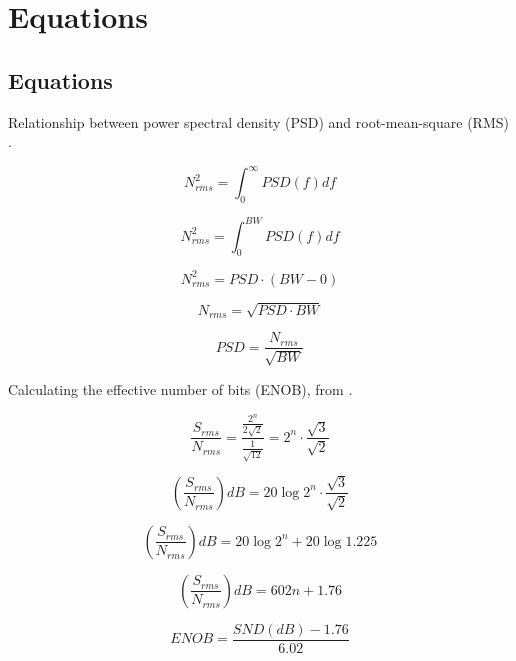 \chapter[Equations]{Equations}

\section{Equations}
Relationship between power spectral density (PSD) and root-mean-square (RMS) \cite{freescale_accel_terminology}.

\begin{equation}
N^{2}_{rms}=\int_0^\infty{PSD(f)df}
\label{eq2}
\end{equation}

\begin{equation}
N^{2}_{rms}=\int_0^{BW}{PSD(f)df}
\label{eq3}
\end{equation}

\begin{equation}
N^{2}_{rms}=PSD \cdot (BW - 0)
\label{eq4}
\end{equation}

\begin{equation}
N_{rms}=\sqrt{PSD \cdot BW}
\label{eq5}
\end{equation}

\begin{equation}
PSD = \frac{N_{rms}}{\sqrt{BW}}
\label{eq6}
\end{equation}

Calculating the effective number of bits (ENOB), from \cite{freescale_accel_terminology}.

\begin{equation}
\frac{S_{rms}}{N_{rms}} = \frac{\frac{2^n}{2\sqrt{2}}}{\frac{1}{\sqrt{12}}} = 2^n \cdot \frac{\sqrt{3}}{\sqrt{2}}
\label{eq7}
\end{equation}

\begin{equation}
(\frac{S_{rms}}{N_{rms}})dB = 20\log{2^n \cdot \frac{\sqrt{3}}{\sqrt{2}}}
\label{eq8}
\end{equation}

\begin{equation}
(\frac{S_{rms}}{N_{rms}})dB = 20\log{2^n} + 20\log{1.225}
\label{eq9}
\end{equation}

\begin{equation}
(\frac{S_{rms}}{N_{rms}})dB = 602n + 1.76
\label{eq10}
\end{equation}

\begin{equation}
ENOB = \frac{SND(dB)-1.76}{6.02}
\end{equation}
